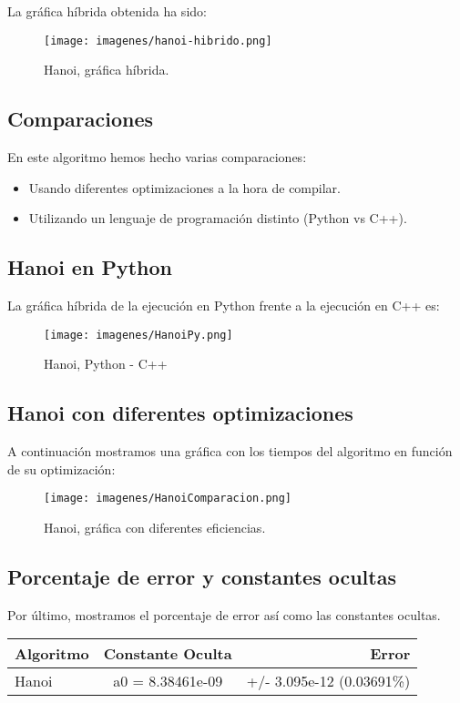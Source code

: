 \documentclass[a4paper, 11pt]{article} %
\begin{document}
La gráfica híbrida obtenida ha sido:
\begin{figure}[htb]
	\centering
	\texttt{[image: imagenes/hanoi-hibrido.png]}
	\caption{Hanoi, gráfica híbrida.}
	\label{fig:E20}
\end{figure}



\subsection{Comparaciones}
En este algoritmo hemos hecho varias comparaciones:
\begin{itemize}
	\item Usando diferentes optimizaciones a la hora de compilar.
	\item Utilizando un lenguaje de programación distinto (Python vs C++).
\end{itemize}

\subsection{Hanoi en Python}
La gráfica híbrida de la ejecución en Python frente a la ejecución en C++ es:
\begin{figure}[htb]
	\centering
	\texttt{[image: imagenes/HanoiPy.png]}
	\caption{Hanoi, Python - C++}
	\label{fig:E21}
\end{figure}



\subsection{Hanoi con diferentes optimizaciones}
A continuación mostramos una gráfica con los tiempos del algoritmo en función de su optimización:
\begin{figure}[htb]
	\centering
	\texttt{[image: imagenes/HanoiComparacion.png]}
	\caption{Hanoi, gráfica con diferentes eficiencias.}
	\label{fig:E22}
\end{figure}



\subsection{Porcentaje de error y constantes ocultas}
Por último, mostramos el porcentaje de error así como las constantes ocultas.\\
\begin{center}
	\begin{tabular}{| l | c | r |}
		\hline
		\textbf{Algoritmo} & \textbf{Constante Oculta} & \textbf{Error} \\ \hline
		Hanoi & a0 = 8.38461e-09 & +/- 3.095e-12    (0.03691\%)\\ \hline
	\end{tabular}
\end{center}
	

\end{document}
